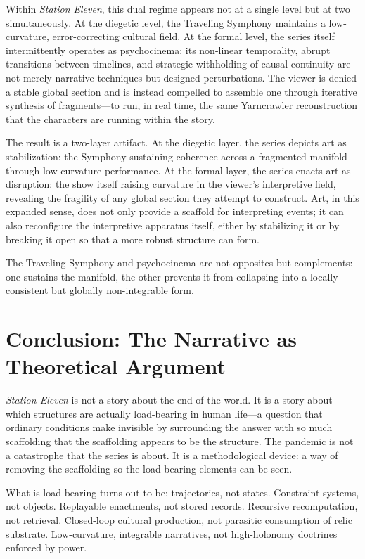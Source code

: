 \documentclass[12pt, oneside]{article}
\theoremstyle{plain}
\theoremstyle{definition}
\theoremstyle{remark}
\begin{document}
Within \textit{Station Eleven}, this dual regime appears not at
a single level but at two simultaneously. At the diegetic level,
the Traveling Symphony maintains a low-curvature, error-correcting
cultural field. At the formal level, the series itself
intermittently operates as psychocinema: its non-linear
temporality, abrupt transitions between timelines, and strategic
withholding of causal continuity are not merely narrative
techniques but designed perturbations. The viewer is denied a
stable global section and is instead compelled to assemble one
through iterative synthesis of fragments---to run, in real time,
the same Yarncrawler reconstruction that the characters are running
within the story.

The result is a two-layer artifact. At the diegetic layer, the
series depicts art as stabilization: the Symphony sustaining
coherence across a fragmented manifold through low-curvature
performance. At the formal layer, the series enacts art as
disruption: the show itself raising curvature in the viewer's
interpretive field, revealing the fragility of any global section
they attempt to construct. Art, in this expanded sense, does not
only provide a scaffold for interpreting events; it can also
reconfigure the interpretive apparatus itself, either by stabilizing
it or by breaking it open so that a more robust structure can form.

The Traveling Symphony and psychocinema are not opposites but
complements: one sustains the manifold, the other prevents it from
collapsing into a locally consistent but globally non-integrable
form.

\section{Conclusion: The Narrative as Theoretical Argument}

\textit{Station Eleven} is not a story about the end of the world.
It is a story about which structures are actually load-bearing in
human life---a question that ordinary conditions make invisible
by surrounding the answer with so much scaffolding that the
scaffolding appears to be the structure. The pandemic is not a
catastrophe that the series is about. It is a methodological device:
a way of removing the scaffolding so the load-bearing elements can
be seen.

What is load-bearing turns out to be: trajectories, not states.
Constraint systems, not objects. Replayable enactments, not stored
records. Recursive recomputation, not retrieval. Closed-loop
cultural production, not parasitic consumption of relic substrate.
Low-curvature, integrable narratives, not high-holonomy doctrines
enforced by power.
\end{document}
